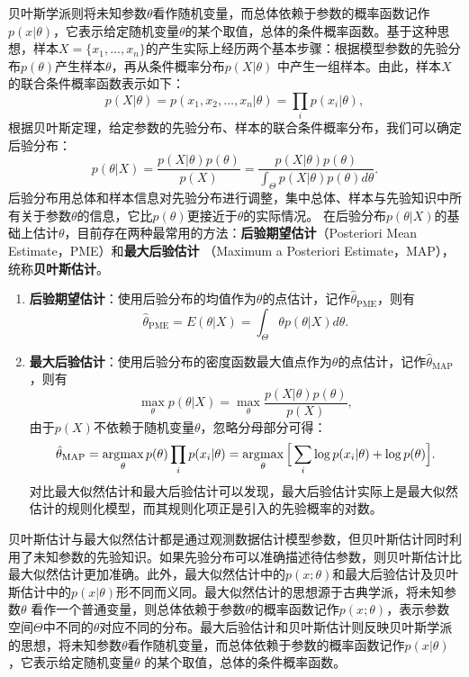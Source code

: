 贝叶斯学派则将未知参数$\theta$看作随机变量，而总体依赖于参数的概率函数记作$p(x|\theta)$，它表示给定随机变量$\theta$的某个取值，总体的条件概率函数。基于这种思想，样本$X=\{x_1,\ldots,x_n\}$的产生实际上经历两个基本步骤：根据模型参数的先验分布$p(\theta)$产生样本$\theta$，再从条件概率分布$p(X|\theta)$ 中产生一组样本。由此，样本$X$的联合条件概率函数表示如下：
\begin{equation}
    p(X|\theta) = p(x_1,x_2,\ldots,x_n|\theta) = \prod\limits_i p(x_i|\theta),
\end{equation}
根据贝叶斯定理，给定参数的先验分布、样本的联合条件概率分布，我们可以确定后验分布：
\begin{equation}
    p(\theta|X) = \frac{p(X|\theta)p(\theta)}{p(X)} = \frac{p(X|\theta)p(\theta)}{\int_\Theta p(X|\theta) p(\theta) d\theta}.
\end{equation}
后验分布用总体和样本信息对先验分布进行调整，集中总体、样本与先验知识中所有关于参数$\theta$的信息，它比$p(\theta)$更接近于$\theta$的实际情况。
在后验分布$p(\theta|X)$的基础上估计$\theta$，目前存在两种最常用的方法：\textbf{后验期望估计}（Posteriori Mean Estimate，PME）和\textbf{最大后验估计}
（Maximum a Posteriori Estimate，MAP），统称\textbf{贝叶斯估计}。
\begin{enumerate}
  \item \textbf{后验期望估计}：使用后验分布的均值作为$\theta$的点估计，记作$\hat \theta_\mathrm{PME}$，则有
        \begin{equation}
            \hat \theta_\mathrm{PME} = E(\theta|X) = \int_\Theta \theta p(\theta|X) d\theta.
        \end{equation}
  \item \textbf{最大后验估计}：使用后验分布的密度函数最大值点作为$\theta$的点估计，记作$\hat\theta_\mathrm{MAP}$，则有
          \begin{equation}
            \max\limits_\theta p(\theta|X) = \max\limits_\theta \frac{p(X|\theta) p(\theta)}{p(X)},
          \end{equation}
        由于$p(X)$不依赖于随机变量$\theta$，忽略分母部分可得：
        \begin{equation}
            \hat\theta_\mathrm{MAP} = \operatorname*{\mathrm{\arg\!\max}}\limits_\theta p(\theta) \prod\limits_i p(x_i|\theta)
            = \operatorname*{\mathrm{\arg\!\max}}\limits_\theta \Big[\sum\limits_i \log p(x_i|\theta) + \log p(\theta)\Big].
        \end{equation}
        对比最大似然估计和最大后验估计可以发现，最大后验估计实际上是最大似然估计的规则化模型，而其规则化项正是引入的先验概率的对数。
\end{enumerate}
贝叶斯估计与最大似然估计都是通过观测数据估计模型参数，但贝叶斯估计同时利用了未知参数的先验知识。如果先验分布可以准确描述待估参数，则贝叶斯估计比最大似然估计更加准确。此外，最大似然估计中的$p(x;\theta)$和最大后验估计及贝叶斯估计中的$p(x|\theta)$形不同而义同。最大似然估计的思想源于古典学派，将未知参数$\theta$ 看作一个普通变量，则总体依赖于参数$\theta$的概率函数记作$p(x;\theta)$，表示参数空间$\Theta$中不同的$\theta$对应不同的分布。最大后验估计和贝叶斯估计则反映贝叶斯学派的思想，将未知参数$\theta$看作随机变量，而总体依赖于参数的概率函数记作$p(x|\theta)$，它表示给定随机变量$\theta$ 的某个取值，总体的条件概率函数。

